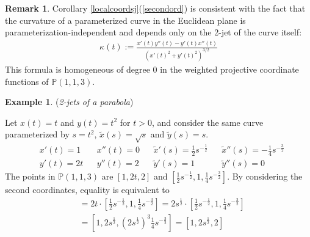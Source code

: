 \documentclass[12pt]{article}
\numberwithin{equation}{section}
\theoremstyle{plain}
\theoremstyle{definition}
\newtheorem{remark}[definition]{Remark}
\newtheorem{example}[definition]{Example}
\renewcommand{\P}{\mathbb{P}}
\begin{document}
\begin{remark} Corollary \ref{localcoordsj}(\ref{secondord}) is consistent with the fact that the curvature of a parameterized curve in the Euclidean plane is parameterization-independent and depends only on the 2-jet of the curve itself:
\begin{align*}
\kappa(t):=\frac{x'(t)y''(t)-y'(t)x''(t)}{(x'(t)^{2}+y'(t)^{2})^{3/2}}
\end{align*}
This formula is homogeneous of degree 0 in the weighted projective coordinate functions of $\P(1,1,3)$.
\end{remark}
\begin{example}\label{2jetsPar} (\emph{2-jets of a parabola})

Let $x(t)=t$ and $y(t)=t^2$ for $t>0$, and consider the same curve parameterized by $s=t^{2}$, $\tilde{x}(s)=\sqrt{s}$ and $\tilde{y}(s)=s$.
\begin{align*}
&x'(t)=1&  &x''(t)=0&  &\tilde{x}'(s)=\tfrac{1}{2}s^{-\tfrac{1}{2}}& &\tilde{x}''(s)=-\tfrac{1}{4}s^{-\tfrac{3}{2}} \\
&y'(t)=2t& &y''(t)=2&  &\tilde{y}'(s)=1&                              &\tilde{y}''(s)=0
\end{align*}
The points in $\P(1,1,3)$ are $[1,2t,2]$ and $[\tfrac{1}{2}s^{-\tfrac{1}{2}},1,\tfrac{1}{4}s^{-\tfrac{3}{2}}]$. By considering the second coordinates, equality is equivalent to
\begin{align*}
[1,2t,2]&=2t\cdot[\tfrac{1}{2}s^{-\tfrac{1}{2}},1,\tfrac{1}{4}s^{-\tfrac{3}{2}}]=2s^{\tfrac{1}{2}}\cdot[\tfrac{1}{2}s^{-\tfrac{1}{2}},1,\tfrac{1}{4}s^{-\tfrac{3}{2}}]\\
&=[1,2s^{\tfrac{1}{2}},(2s^{\tfrac{1}{2}})^3\tfrac{1}{4}s^{-\tfrac{3}{2}}]=[1,2s^{\tfrac{1}{2}},2]
\end{align*}
\end{example}
\end{document}
